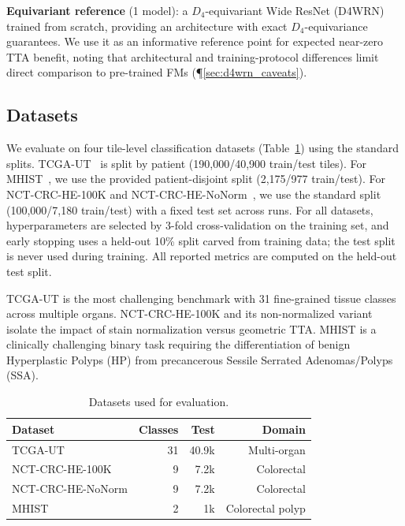 \documentclass{melba}
\begin{document}
\textbf{Equivariant reference} (1 model): a $D_4$-equivariant Wide ResNet (D4WRN)~\citep{zagoruyko2016wide,weiler2019general} trained from scratch, providing an architecture with exact $D_4$-equivariance guarantees. We use it as an informative reference point for expected near-zero TTA benefit, noting that architectural and training-protocol differences limit direct comparison to pre-trained FMs (\P\ref{sec:d4wrn_caveats}).


\subsection{Datasets}

We evaluate on four tile-level classification datasets (Table~\ref{tab:datasets}) using the standard splits. TCGA-UT~\citep{komura2022universal} is split by patient (190{,}000/40{,}900 train/test tiles). For MHIST~\citep{wei2021petri}, we use the provided patient-disjoint split (2{,}175/977 train/test). For NCT-CRC-HE-100K and NCT-CRC-HE-NoNorm~\citep{kather2019predicting}, we use the standard split (100{,}000/7{,}180 train/test) with a fixed test set across runs. For all datasets, hyperparameters are selected by 3-fold cross-validation on the training set, and early stopping uses a held-out 10\% split carved from training data; the test split is never used during training. All reported metrics are computed on the held-out test split.

TCGA-UT is the most challenging benchmark with 31 fine-grained tissue classes across multiple organs. NCT-CRC-HE-100K and its non-normalized variant isolate the impact of stain normalization versus geometric TTA. MHIST is a clinically challenging binary task requiring the differentiation of benign Hyperplastic Polyps (HP) from precancerous Sessile Serrated Adenomas/Polyps (SSA).

\begin{table}[h] 
    \centering
    \caption{Datasets used for evaluation.}
    \label{tab:datasets}
    \vspace{6pt} 
    \small
    \begin{tabular}{@{}lrrr@{}} 
        \toprule
        Dataset & Classes & Test & Domain \\
        \midrule
        TCGA-UT           & 31 & 40.9k & Multi-organ \\
        NCT-CRC-HE-100K   & 9  & 7.2k  & Colorectal \\
        NCT-CRC-HE-NoNorm & 9  & 7.2k  & Colorectal \\
        MHIST             & 2  & 1k    & Colorectal polyp \\
        \bottomrule
    \end{tabular}
\end{table}
\end{document}
